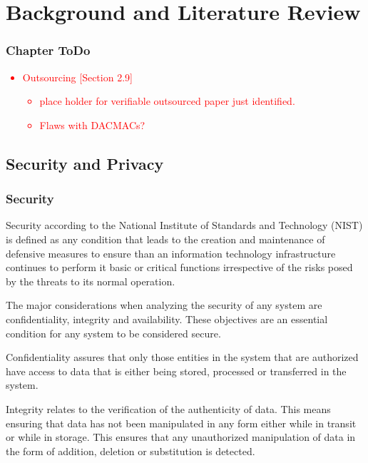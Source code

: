 \chapter{Background and Literature Review}
\label{chap:background_literature_review}

\subsection*{Chapter ToDo}
\textcolor{red}{
	\begin{itemize}
		\item Outsourcing [Section 2.9]
		\begin{itemize}
			\item place holder for verifiable outsourced paper just identified.
			\item Flaws with DACMACs?
		\end{itemize}
	\end{itemize}
}

\section{Security and Privacy}

\subsection{Security}
Security according to the National Institute of Standards and Technology (NIST) \cite{Kissel2013} is defined as any condition that leads to the creation and maintenance of defensive measures to ensure than an information technology infrastructure continues to perform it basic or critical functions irrespective of the risks posed by the threats to its normal operation.

The major considerations when analyzing the security of any system are confidentiality, integrity and availability. These objectives are an essential condition for any system to be considered secure.

Confidentiality \cite{Kissel2013} assures that only those entities in the system that are authorized have access to data that is either being stored, processed or transferred in the system.

Integrity \cite{Kissel2013} relates to the verification of the authenticity of data. This means ensuring that data has not been manipulated in any form either while in transit or while in storage. This ensures that any unauthorized manipulation of data in the form of addition, deletion or substitution is detected.


